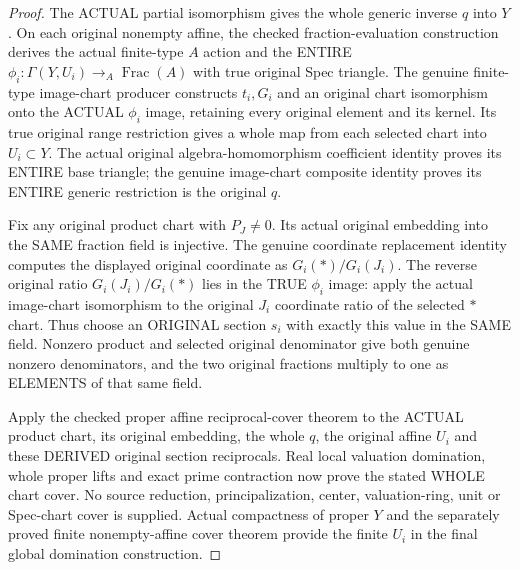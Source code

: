 \begin{proof}
The ACTUAL partial isomorphism gives the whole generic inverse $q$ into $Y$.
On each original nonempty affine, the checked fraction-evaluation construction
derives the actual finite-type $A$ action and the ENTIRE
$\phi_i:\Gamma(Y,U_i)\to_A\operatorname{Frac}(A)$ with true original Spec
triangle.  The genuine finite-type image-chart producer constructs $t_i,G_i$
and an original chart isomorphism onto the ACTUAL $\phi_i$ image, retaining
every original element and its kernel.
Its true original range restriction gives a whole map from each selected
chart into $U_i\subset Y$.  The actual original algebra-homomorphism
coefficient identity proves its ENTIRE base triangle; the genuine image-chart
composite identity proves its ENTIRE generic restriction is the original $q$.

Fix any original product chart with $P_J\ne0$.  Its actual original embedding
into the SAME fraction field is injective.  The genuine coordinate replacement
identity computes the displayed original coordinate as $G_i(*)/G_i(J_i)$.
The reverse original ratio $G_i(J_i)/G_i(*)$ lies in the TRUE $\phi_i$ image:
apply the actual image-chart isomorphism to the original $J_i$ coordinate
ratio of the selected $*$ chart.  Thus choose an ORIGINAL section $s_i$ with
exactly this value in the SAME field.  Nonzero product and selected original
denominator give both genuine nonzero denominators, and the two original
fractions multiply to one as ELEMENTS of that same field.

Apply the checked proper affine reciprocal-cover theorem to the ACTUAL
product chart, its original embedding, the whole $q$, the original affine
$U_i$ and these DERIVED original section reciprocals.  Real local valuation
domination, whole proper lifts and exact prime contraction now prove the
stated WHOLE chart cover.  No source reduction, principalization, center,
valuation-ring, unit or Spec-chart cover is supplied.  Actual compactness of
proper $Y$ and the separately proved finite nonempty-affine cover theorem
provide the finite $U_i$ in the final global domination construction.
\end{proof}
